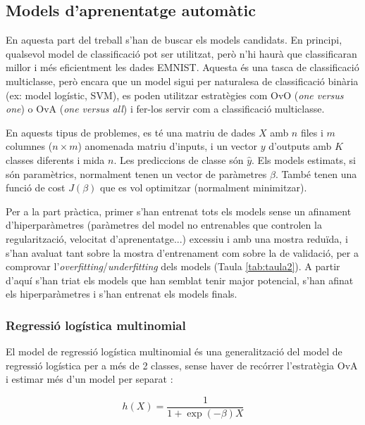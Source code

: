 \documentclass[12pt, spanish]{article}
\begin{document}
\subsection{Models d'aprenentatge automàtic}


En aquesta part del treball s'han de buscar els models candidats. En principi, qualsevol model de classificació pot ser utilitzat, però n'hi haurà que classificaran millor i més eficientment les dades EMNIST. Aquesta és una tasca de classificació multiclasse, però encara que un model sigui per naturalesa de classificació binària (ex: model logístic, SVM), es poden utilitzar estratègies com OvO (\textit{one versus one}) o OvA (\textit{one versus all}) i fer-los servir com a classificació multiclasse. 

En aquests tipus de problemes, es té una matriu de dades $X$ amb $n$ files i $m$ columnes ($n\times m$) anomenada matriu d'inputs, i un vector $y$ d'outputs amb $K$ classes diferents i mida $n$. Les prediccions de classe són $\hat{y}$. Els models estimats, si són paramètrics, normalment tenen un vector de paràmetres $\beta$. També tenen una funció de cost $J(\beta)$ que es vol optimitzar (normalment minimitzar). 

Per a la part pràctica, primer s'han entrenat tots els models sense un afinament d'hiperparàmetres (paràmetres del model no entrenables que controlen la regularització, velocitat d'aprenentatge...) excessiu i amb una mostra reduïda, i s'han avaluat tant sobre la mostra d'entrenament com sobre la de validació, per a comprovar l'\textit{overfitting}/\textit{underfitting} dels models (Taula \ref{tab:taula2}). A partir d'aquí s'han triat els models que han semblat tenir major potencial, s'han afinat els hiperparàmetres i s'han entrenat els models finals. 

\subsubsection{Regressió logística multinomial}

El model de regressió logística multinomial és una generalització del model de regressió logística per a més de 2 classes, sense haver de recórrer l'estratègia OvA i estimar més d'un model per separat \cite{stanford}:

$$
h(X) = \frac{1}{1 + \exp(-\beta)X}
$$
\end{document}
